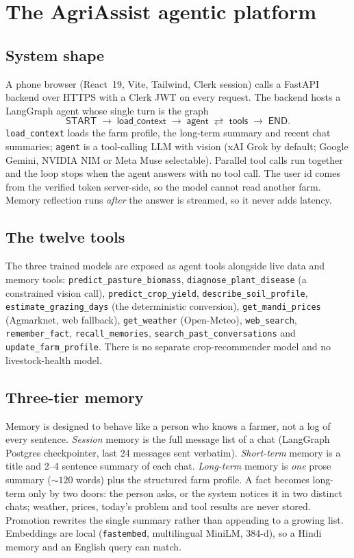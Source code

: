 \documentclass[11pt,a4paper]{article}
\begin{document}
\section{The AgriAssist agentic platform}\label{sec:agent}

\subsection{System shape}
A phone browser (React~19, Vite, Tailwind, Clerk session) calls a FastAPI backend over HTTPS with a
Clerk JWT on every request. The backend hosts a LangGraph agent whose single turn is the graph
\[
\textsf{START}\;\to\;\textsf{load\_context}\;\to\;\textsf{agent}\;\rightleftarrows\;\textsf{tools}\;\to\;\textsf{END}.
\]
\texttt{load\_context} loads the farm profile, the long-term summary and recent chat summaries;
\texttt{agent} is a tool-calling LLM with vision (xAI Grok by default; Google Gemini, NVIDIA NIM or
Meta Muse selectable). Parallel tool calls run together and the loop stops when the agent answers
with no tool call. The user id comes from the verified token server-side, so the model cannot read
another farm. Memory reflection runs \emph{after} the answer is streamed, so it never adds latency.

\subsection{The twelve tools}
The three trained models are exposed as agent tools alongside live data and memory tools:
\texttt{predict\_pasture\_biomass}, \texttt{diagnose\_plant\_disease} (a constrained vision call),
\texttt{predict\_crop\_yield}, \texttt{describe\_soil\_profile}, \texttt{estimate\_grazing\_days}
(the deterministic conversion), \texttt{get\_mandi\_prices} (Agmarknet, web fallback),
\texttt{get\_weather} (Open-Meteo), \texttt{web\_search}, \texttt{remember\_fact},
\texttt{recall\_memories}, \texttt{search\_past\_conversations} and \texttt{update\_farm\_profile}.
There is no separate crop-recommender model and no livestock-health model.

\subsection{Three-tier memory}
Memory is designed to behave like a person who knows a farmer, not a log of every sentence.
\emph{Session} memory is the full message list of a chat (LangGraph Postgres checkpointer, last 24
messages sent verbatim). \emph{Short-term} memory is a title and 2--4 sentence summary of each chat.
\emph{Long-term} memory is \emph{one} prose summary ($\sim120$ words) plus the structured farm
profile. A fact becomes long-term only by two doors: the person asks, or the system notices it in
two distinct chats; weather, prices, today's problem and tool results are never stored. Promotion
rewrites the single summary rather than appending to a growing list. Embeddings are local
(\texttt{fastembed}, multilingual MiniLM, 384-d), so a Hindi memory and an English query can match.
\end{document}
